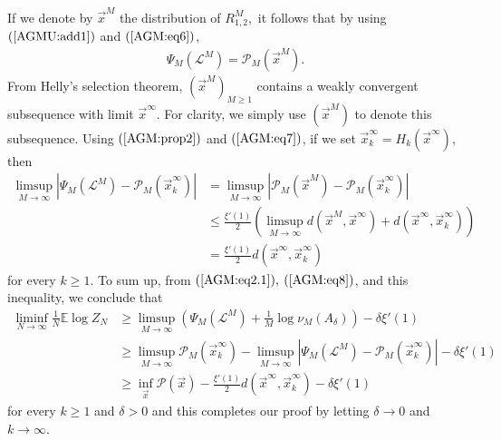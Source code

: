 \documentclass[12pt]{article}
\def\bbox{\quad\hbox{\vrule \vbox{\hrule \vskip2pt \hbox{\hskip2pt
\vbox{\hsize=1pt}\hskip2pt} \vskip2pt\hrule}\vrule}}
\def\qed{\hfill\break\rightline{$\bbox$}}
\newcommand{\vx}{\vec{x}}
\newenvironment{Proof of lemma}{\noindent{\bf Proof of Lemma}}{\hfill$\Box$\newline}
\newenvironment{Proof of theorem}{\noindent{\bf Proof of Theorem}}{\hfill{\footnotesize${\square}$}\newline}
\newenvironment{Proof of theorems}{\noindent{\bf Proof of Theorems}}{\hfill$\Box$\newline}
\newenvironment{Proof of proposition}{\noindent{\bf Proof of Proposition}}{\hfill$\Box$\newline}
\newenvironment{Proof of propositions}{\noindent{\bf Proof of Propositions}}{\hfill$\Box$\newline}
\newenvironment{Proof of exercise}{\noindent{\it Proof of Exercise:}}{\hfill$\Box$}
\numberwithin{equation}{section}
\begin{document}
 If we denote by $\vx^M$ the distribution of $R_{1,2}^M,$ it follows that by using $(\ref{AGMU:add1})$ and  $(\ref{AGM:eq6})$,
\begin{align}\label{AGM:eq7} 
\Psi_M(\mathcal{L}^M)=\mathcal{P}_M(\vx^M).
\end{align}
From Helly's selection theorem, $(\vx^M)_{M\geq 1}$ contains a weakly convergent subsequence with limit $\vx^\infty.$ For clarity, we simply use $(\vx^M)$ to denote this subsequence. Using $(\ref{AGM:prop2})$ and $(\ref{AGM:eq7})$, if we set $\vx_k^\infty=H_k(\vx^\infty),$ then
\begin{align*}
\limsup_{M\rightarrow\infty}\left|\Psi_M(\mathcal{L}^M)-\mathcal{P}_M(\vx_k^{\infty})\right|
&=\limsup_{M\rightarrow\infty}\left|\mathcal{P}_M(\vx^M)-\mathcal{P}_M(\vx_k^{\infty})\right|\\
&\leq \frac{\xi'(1)}{2}\left(\limsup_{M\rightarrow\infty}d(\vx^M,\vx^{\infty})+d(\vx^\infty,\vx_k^{\infty})\right)\\
&=\frac{\xi'(1)}{2}d(\vx^\infty,\vx_k^{\infty})
\end{align*} 
for every $k\geq 1.$ To sum up, from $(\ref{AGM:eq2.1}),$ $(\ref{AGM:eq8})$, and this inequality, we conclude that 
\begin{align*}
\liminf_{N\rightarrow\infty}\frac{1}{N}\mathbb{E}\log Z_N&\geq \limsup_{M\rightarrow\infty}\left( \Psi_M(\mathcal{L}^M)+\frac{1}{M}\log\nu_M(A_\delta)\right)-\delta\xi'(1)\\
&\geq \limsup_{M\rightarrow\infty}\mathcal{P}_M(\vx_k^\infty)-\limsup_{M\rightarrow\infty}\left|\Psi_M(\mathcal{L}^M)-\mathcal{P}_M(\vx_k^\infty)\right|-\delta\xi'(1)\\
&\geq\inf_{\vx}\mathcal{P}(\vx)-\frac{\xi'(1)}{2}d(\vx^\infty,\vx_k^{\infty})-\delta\xi'(1)
\end{align*}
for every $k\geq 1$ and $\delta>0$ and this completes our proof by letting $\delta\rightarrow 0$ and $k\rightarrow\infty.$\qed
 
\end{document}

